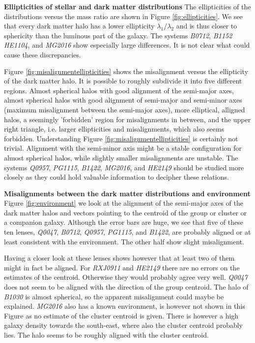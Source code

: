 \documentclass[useAMS,usenatbib]{mn2e}
\begin{document}
\textbf{Ellipticities of stellar and dark matter distributions}
The ellipticities of the distributions versus the mass ratio are shown in Figure \ref{fig:ellipticities}. We see that every dark matter halo has a lower ellipticity $\lambda_{1}/\lambda_{2}$ and is thus closer to sphericity than the luminous part of the galaxy. The systems \textit{B0712}, \textit{B1152} \textit{HE1104}, and \textit{MG2016} show especially large differences. It is not clear what could cause these discrepancies.

Figure \ref{fig:misalignmentellipticities} shows the misalignment versus the ellipticity of the dark matter halo. It is possible to roughly subdivide it into five different regions. Almost spherical halos with good alignment of the semi-major axes, almost spherical halos with good alignment of semi-major and semi-minor axes (maximum misalignment between the semi-major axes), more elliptical, alligned halos, a seemingly 'forbidden' region for misalignments in between, and the upper right triangle, i.e. larger ellipticities and misalignments, which also seems forbidden. Understanding Figure \ref{fig:misalignmentellipticities} is certainly not trivial. Alignment with the semi-minor axis might be a stable configuration for almost spherical halos, while slightly smaller misalignments are unstable. The systems \textit{Q0957}, \textit{PG1115}, \textit{B1422}, \textit{MG2016}, and \textit{HE2149} should be studied more closely as they could hold valuable information to decipher these relations.






\textbf{Misalignments between the dark matter distributions and environment}
Figure \ref{fig:environment} we look at the alignment of the semi-major axes of the dark matter halos and vectors pointing to the centroid of the group or cluster or a companion galaxy. Although the error bars are huge, we see that five of these ten lenses, \textit{Q0047}, \textit{B0712}, \textit{Q0957}, \textit{PG1115}, and \textit{B1422}, are probably aligned or at least consistent with the environment. The other half show slight misalignment.

Having a closer look at these lenses shows however that at least two of them might in fact be aligned. For \textit{RXJ0911} and \textit{HE2149} there are no errors on the estimates of the centroid. Otherwise they would probably agree very well. \textit{Q0047} does not seem to be aligned with the direction of the group centroid. The halo of \textit{B1030} is almost spherical, so the apparent misalignment could maybe be explained. \textit{MG2016} also has a known environment, is however not shown in this Figure as no estimate of the cluster centroid is given. There is however a high galaxy density towards the south-east, where also the cluster centroid probably lies. The halo seems to be roughly aligned with the cluster centroid. %
\end{document}
